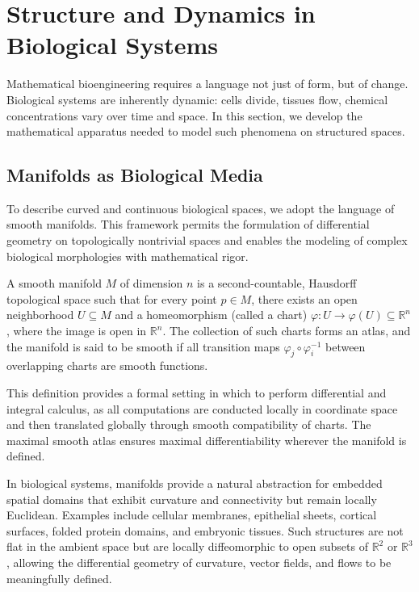 \newpage
\section[Structure and Dynamics in Biological Systems]{Structure and Dynamics in \\ Biological Systems}
\label{sec:structure_dynamics}

Mathematical bioengineering requires a language not just of form, but of change. Biological systems are inherently dynamic: cells divide, tissues flow, chemical concentrations vary over time and space. In this section, we develop the mathematical apparatus needed to model such phenomena on structured spaces.

\subsection{Manifolds as Biological Media}

To describe curved and continuous biological spaces, we adopt the language of smooth manifolds. This framework permits the formulation of differential geometry on topologically nontrivial spaces and enables the modeling of complex biological morphologies with mathematical rigor.

\begin{definition}
A smooth manifold $M$ of dimension $n$ is a second-countable, Hausdorff topological space such that for every point $p \in M$, there exists an open neighborhood $U \subseteq M$ and a homeomorphism (called a chart) $\varphi : U \to \varphi(U) \subseteq \mathbb{R}^n$, where the image is open in $\mathbb{R}^n$. The collection of such charts forms an atlas, and the manifold is said to be smooth if all transition maps $\varphi_j \circ \varphi_i^{-1}$ between overlapping charts are smooth functions.
\end{definition}

This definition provides a formal setting in which to perform differential and integral calculus, as all computations are conducted locally in coordinate space and then translated globally through smooth compatibility of charts. The maximal smooth atlas ensures maximal differentiability wherever the manifold is defined.

In biological systems, manifolds provide a natural abstraction for embedded spatial domains that exhibit curvature and connectivity but remain locally Euclidean. Examples include cellular membranes, epithelial sheets, cortical surfaces, folded protein domains, and embryonic tissues. Such structures are not flat in the ambient space but are locally diffeomorphic to open subsets of $\mathbb{R}^2$ or $\mathbb{R}^3$, allowing the differential geometry of curvature, vector fields, and flows to be meaningfully defined.

